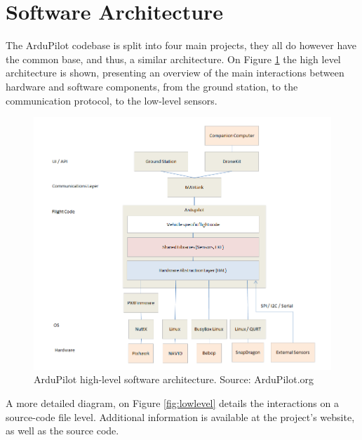 \section{Software Architecture}

The ArduPilot codebase is split into four main projects, they all do however have the common base, and thus, a similar architecture. On Figure \ref{fig:highlevel} the high level architecture is shown, presenting an overview of the main interactions between hardware and software components, from the ground station, to the communication protocol, to the low-level sensors.

\begin{figure}[h]
\centering
  \includegraphics[width=0.95\linewidth]{figs/highlevelarch.png}
  \caption{ArduPilot high-level software architecture. Source: ArduPilot.org}
  \label{fig:highlevel}
\end{figure}

A more detailed diagram, on Figure \ref{fig:lowlevel} details the interactions on a source-code file level. Additional information is available at the project's website, as well as the source code\cite{ardupilotcode}.


